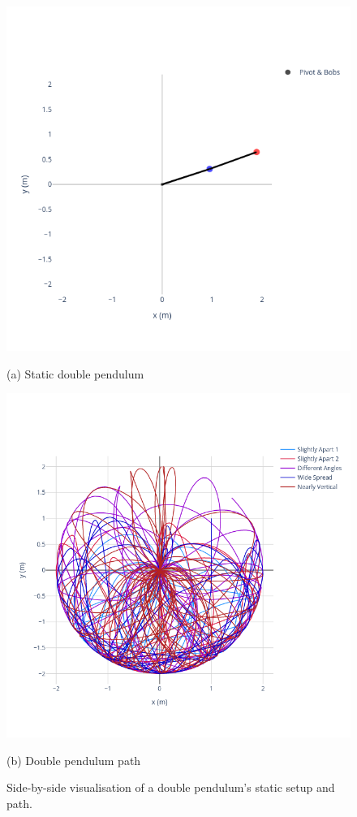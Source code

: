 \documentclass{article}
\begin{document}
\begin{figure}[H]
    \centering
    \begin{minipage}{0.45\textwidth}
        \centering
        \includegraphics[width=\linewidth]{double_pendulum_static}
        \caption{(a) Static double pendulum}
    \end{minipage}%
    \hfill
    \begin{minipage}{0.45\textwidth}
        \centering
        \includegraphics[width=\linewidth]{double_pendulum_path}
        \caption{(b) Double pendulum path}
    \end{minipage}
    \caption{Side-by-side visualisation of a double pendulum's static setup and path.}
    \label{fig:double_pendulum_side_by_side}
\end{figure}\\
\end{document}
